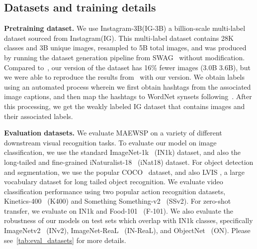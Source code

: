 \documentclass[10pt,twocolumn,letterpaper]{article}
\newcommand{\swag}{SWAG\xspace}
\newcommand{\ours}{MAEWSP\xspace}  \newcommand{\oursig}{\ours{}\textsubscript{IG}\xspace}
\newcommand{\igShort}{IG\xspace}
\newcommand{\igSizeShort}{IG-3B\xspace}
\newcommand{\igSize}{Instagram-3B\xspace}
\newcommand{\ig}{Instagram\xspace}
\newcommand{\inetOneK}{ImageNet-1k\xspace}
\newcommand{\inetOneKShort}{IN1k\xspace}
\newcommand{\inetReal}{ImageNet-ReaL\xspace}
\newcommand{\inetRealShort}{IN-ReaL\xspace}
\newcommand{\objectNet}{ObjectNet\xspace}
\newcommand{\objectNetShort}{ON\xspace}
\newcommand{\inetvTwo}{ImageNetv2\xspace}
\newcommand{\inetvTwoShort}{INv2\xspace}
\newcommand{\kinetics}{Kinetics-400\xspace}
\newcommand{\kineticsShort}{K400\xspace}
\newcommand{\inat}{iNaturalist-18\xspace}
\newcommand{\inatShort}{iNat18\xspace}
\newcommand{\sthsth}{Something Something-v2\xspace}
\newcommand{\sthsthShort}{SSv2\xspace}
\newcommand{\cocoShort}{COCO\xspace}
\newcommand{\lvisShort}{LVIS\xspace}
\newcommand{\food}{Food-101\xspace}
\newcommand{\foodShort}{F-101\xspace}
\begin{document}
\subsection{Datasets and training details}

\noindent \textbf{Pretraining dataset.} We use \igSize(\igSizeShort) a billion-scale multi-label dataset
sourced from \ig (\igShort). 
This multi-label dataset contains 28K classes and 3B unique images, resampled to 5B total images,
and was produced by running the dataset generation pipeline from \swag~\cite{singh2022revisiting} without modification.
Compared to~\cite{singh2022revisiting}, our
version of the dataset has 16\% fewer images (3.0B \vs 3.6B), but we were able to reproduce the results
from~\cite{singh2022revisiting} with our version.
We obtain labels using an automated process wherein we first obtain hashtags from the associated image captions, and
then map the hashtags to WordNet synsets following~\cite{singh2022revisiting}.
After this processing, we get the weakly labeled \igShort dataset that contains images and their associated labels.



\par \noindent \textbf{Evaluation datasets.}
We evaluate \ours on a variety of different downstream visual recognition tasks.
To evaluate our model on image classification, we use the standard \inetOneK~\cite{ILSVRC15} (\inetOneKShort) dataset,
and also the long-tailed and fine-grained \inat~\cite{iNaturalist} (\inatShort) dataset.
For object detection and segmentation, we use the popular \cocoShort~\cite{lin2014microsoft} dataset, and also \lvisShort
\cite{gupta2019lvis}, a large vocabulary dataset for long tailed object recognition.
We evaluate video classification performance using two popular action recognition datasets, \kinetics~\cite{kay2017kinetics}
(\kineticsShort) and \sthsth~\cite{goyal2017something} (\sthsthShort). For zero-shot transfer, we evaluate on \inetOneKShort
and \food~\cite{bossard2014food} (\foodShort).
We also evaluate the robustness of our models on test sets which overlap with \inetOneKShort classes, specifically
\inetvTwo~\cite{recht2019imagenet} (\inetvTwoShort), \inetReal~\cite{beyer2020we} (\inetRealShort),
and \objectNet~\cite{barbu2019objectnet} (\objectNetShort). 
Please see~\cref{tab:eval_datasets} for more details.
\end{document}
